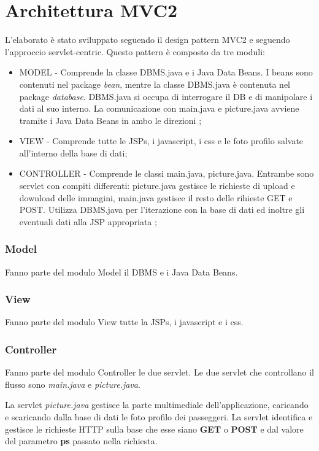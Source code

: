 \documentclass[a4paper,10pt]{article}
\begin{document}
\part{Architettura MVC2}
L'elaborato \`e stato sviluppato seguendo il design pattern MVC2 e seguendo l'approccio servlet-centric. Questo pattern \`e composto da tre moduli:

\begin{itemize}
 \item MODEL -  Comprende la classe DBMS.java e i Java Data Beans. I beans sono contenuti nel package \textit{bean}, mentre la classe DBMS.java \`e contenuta nel 
		package \textit{database}. DBMS.java si occupa di interrogare il DB e di manipolare i dati al suo interno. 
		La comunicazione con main.java e picture.java  avviene tramite i 
		Java Data Beans in ambo le direzioni ;
 \item VIEW - Comprende tutte le JSPs, i javascript, i css e le foto profilo salvate all'interno della base di dati;
 \item CONTROLLER - Comprende le classi main.java, picture.java. Entrambe sono servlet con compiti differenti: picture.java gestisce le richieste di upload e download delle
		    immagini, main.java gestisce il resto delle rihieste GET e POST. Utilizza DBMS.java per l'iterazione con la base di dati ed inoltre 
		    gli eventuali dati alla JSP appropriata ;
\end{itemize}

\section{Model}
Fanno parte del modulo Model il DBMS e i Java Data Beans. 
\section{View}
Fanno parte del modulo View tutte la JSPs, i javascript e i css.
\section{Controller}
Fanno parte del modulo Controller le due servlet. Le due servlet che controllano il flusso sono \textit{main.java} e \textit{picture.java}. 

La servlet \textit{picture.java} gestisce la parte multimediale dell'applicazione, caricando e scaricando dalla base di dati le foto profilo dei passeggeri.
La servlet identifica e gestisce le richieste HTTP sulla base che esse siano \textbf{GET} o \textbf{POST} e dal valore del parametro \textbf{ps} passato nella richiesta.
\end{document}
